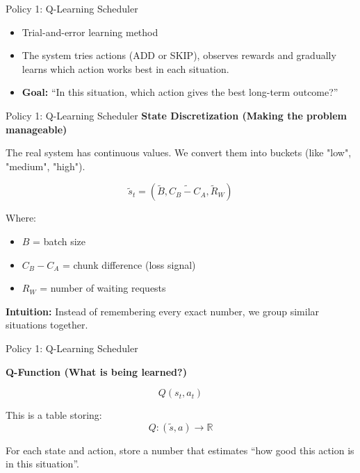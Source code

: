 \documentclass[Serif, 10pt, brown]{beamer}
\theoremstyle{example}
\theoremstyle{plain}
\begin{document}
\begin{frame}{Policy 1: Q-Learning Scheduler}

    \begin{itemize}
        \item Trial-and-error learning method
        \item The system tries actions (ADD or SKIP), observes rewards and gradually learns which action works best in each situation.
        \item \textbf{Goal:} ``In this situation, which action gives the best long-term outcome?''
    \end{itemize}
\end{frame}
\begin{frame}{Policy 1: Q-Learning Scheduler}
\textbf{State Discretization (Making the problem manageable)}

The real system has continuous values.
We convert them into buckets (like "low", "medium", "high").

\[
\tilde{s}_t = (\tilde{B}, \widetilde{C_B - C_A}, \tilde{R}_W)
\]

Where:
\begin{itemize}
    \item $B$ = batch size
    \item $C_B - C_A$ = chunk difference (loss signal)
    \item $R_W$ = number of waiting requests
\end{itemize}

\textbf{Intuition:}
Instead of remembering every exact number,
we group similar situations together.

\end{frame}
\begin{frame}{Policy 1: Q-Learning Scheduler}

\textbf{Q-Function (What is being learned?)}

\[
Q(s_t, a_t)
\]

This is a table storing:
\[
Q : (\tilde{s}, a) \rightarrow \mathbb{R}
\]

For each state and action,
store a number that estimates
``how good this action is in this situation''.

\end{frame}
\end{document}
